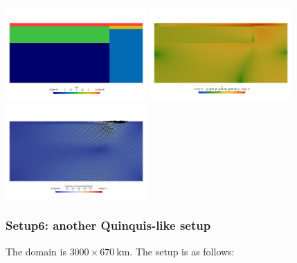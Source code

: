\begin{center}
\includegraphics[width=5.4cm]{python_codes/fieldstone_67/results/mato83/mats}
\includegraphics[width=5.4cm]{python_codes/fieldstone_67/results/mato83/sr}
\includegraphics[width=5.4cm]{python_codes/fieldstone_67/results/mato83/vel}
\end{center}



\newpage
\subsubsection*{Setup6: another Quinquis-like setup}

The domain is $3000\times 670~\si{\km}$. The setup is as follows:

